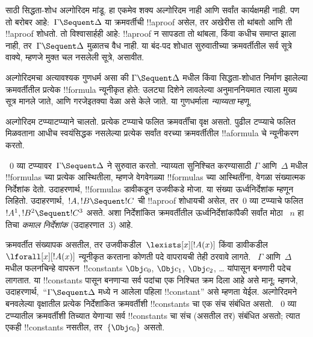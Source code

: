\documentclass[../../../include/open-logic-section]{subfiles}
\begin{document}


 साठी सिद्धता-शोध अल्गोरिदम मांडू.
हा एकमेव शक्य अल्गोरिदम नाही आणि सर्वांत कार्यक्षमही
नाही. पण तो बरोबर आहे:~$\Gamma \Sequent \Delta$
या क्रमवर्तीची !!a{proof} असेल, तर अखेरीस तो
थांबतो आणि ती !!a{proof} शोधतो. तो विश्वासार्हही
आहे: !!a{proof} न सापडता तो थांबला, किंवा कधीच
समाप्त झाला नाही, तर~$\Gamma \Sequent \Delta$
मुळातच वैध नाही.
या बंद-पद शोधात सुरुवातीच्या क्रमवर्तीतील सर्व सूत्रे
वाक्ये, म्हणजे मुक्त चल नसलेली सूत्रे, असावीत.

अल्गोरिदमचा अत्यावश्यक गुणधर्म असा की
$\Gamma \Sequent \Delta$ मधील किंवा सिद्धता-शोधात
निर्माण झालेल्या क्रमवर्तीतील प्रत्येक !!{formula}
न्यूनीकृत होते: उलट्या दिशेने लावलेल्या
अनुमाननियमात त्याला मुख्य सूत्र मानले जाते,
आणि गरजेइतक्या वेळा असे केले जाते.
या गुणधर्माला \emph{न्याय्यता} म्हणू.

अल्गोरिदम टप्प्याटप्प्याने चालतो.
प्रत्येक टप्प्याचे फलित क्रमवर्तींचा वृक्ष असतो.
पुढील टप्प्याचे फलित मिळवताना आधीच स्वयंसिद्धक
नसलेल्या प्रत्येक सर्वांत वरच्या क्रमवर्तीतील
!!a{formula} चे न्यूनीकरण करतो.

~$0$ व्या टप्प्यावर~$\Gamma \Sequent \Delta$
ने सुरुवात करतो. न्याय्यता सुनिश्चित करण्यासाठी
$\Gamma$ आणि~$\Delta$ मधील !!{formula}s च्या
प्रत्येक आस्थितीला, म्हणजे वेगवेगळ्या !!{formula}s
च्या आस्थितींना, वेगळा संख्यात्मक निर्देशांक
देतो. उदाहरणार्थ, !!{formula}s डावीकडून उजवीकडे
मोजा. या संख्या ऊर्ध्वनिर्देशांक म्हणून लिहितो.
उदाहरणार्थ,~$!A, !B \Sequent !C$ ची !!a{proof}
शोधायची असेल, तर~$0$ व्या टप्प्याचे फलित
$!A^1, !B^2 \Sequent !C^3$ असते. अशा निर्देशांकित
क्रमवर्तीतील ऊर्ध्वनिर्देशांकांपैकी सर्वांत मोठा
~$n$ हा तिचा \emph{कमाल निर्देशांक}
(उदाहरणात~$3$) आहे.

क्रमवर्तीत संख्यापक असतील, तर
उजवीकडील~$\lexists[x][!A(x)]$ किंवा डावीकडील
$\lforall[x][!A(x)]$ न्यूनीकृत करताना कोणती पदे
वापरायची तेही ठरवावे लागते. ~$\Gamma$ आणि~$\Delta$
मधील फलनचिन्हे वापरून~!!{constant}s
$\Obj c_0$, $\Obj c_1$, $\Obj c_2$, \dots
यांपासून बनणारी पदेच लागतात. या !!{constant}s
पासून बनणाऱ्या सर्व पदांचा
एक निश्चित क्रम दिला आहे असे मानू; म्हणजे,
उदाहरणार्थ,~``$\Gamma \Sequent \Delta$ मध्ये
न आलेला पहिला !!{constant}'' असे म्हणता येईल.
अल्गोरिदमने बनवलेल्या वृक्षातील प्रत्येक
निर्देशांकित क्रमवर्तीशी !!{constant}s चा एक संच
संबंधित असतो. ~$0$ व्या टप्प्यातील क्रमवर्तीशी
तिच्यात येणाऱ्या सर्व !!{constant}s चा संच
(असतील तर) संबंधित असतो; त्यात एकही
!!{constant}s नसतील, तर~$\{\Obj c_0\}$ असतो.
\end{document}
